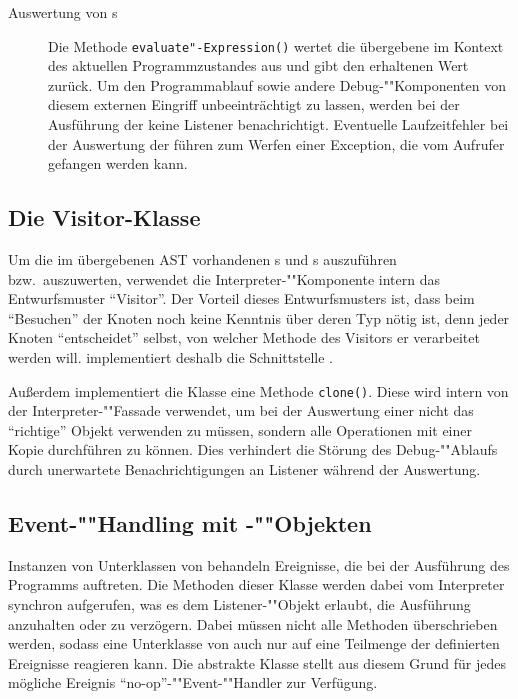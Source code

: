 \begin{description}
    \item[Auswertung von s]
    Die Methode \texttt{evaluate"-Expression()} wertet die übergebene  im Kontext des aktuellen Programmzustandes aus und gibt den erhaltenen Wert zurück. Um den Programmablauf sowie andere Debug-""Komponenten von diesem externen Eingriff unbeeinträchtigt zu lassen, werden bei der Ausführung der  keine Listener benachrichtigt. Eventuelle Laufzeitfehler bei der Auswertung der  führen zum Werfen einer Exception, die vom Aufrufer gefangen werden kann.
\end{description}

\subsection{Die Visitor-Klasse }
Um die im übergebenen AST vorhandenen s und s auszuführen bzw.\ auszuwerten, verwendet die Interpreter-""Komponente intern das Entwurfsmuster "`Visitor"'. Der Vorteil dieses Entwurfsmusters ist, dass beim "`Besuchen"' der Knoten noch keine Kenntnis über deren Typ nötig ist, denn jeder Knoten "`entscheidet"' selbst, von welcher Methode des Visitors er verarbeitet werden will.  implementiert deshalb die Schnittstelle .

Außerdem implementiert die Klasse  eine Methode \texttt{clone()}. Diese wird intern von der Interpreter-""Fassade verwendet, um bei der Auswertung einer  nicht das "`richtige"' Objekt verwenden zu müssen, sondern alle Operationen mit einer Kopie durchführen zu können. Dies verhindert die Störung des Debug-""Ablaufs durch unerwartete Benachrichtigungen an Listener während der Auswertung.

\subsection{Event-""Handling mit -""Objekten}
Instanzen von Unterklassen von  behandeln Ereignisse, die bei der Ausführung des Programms auftreten. Die Methoden dieser Klasse werden dabei vom Interpreter synchron aufgerufen, was es dem Listener-""Objekt erlaubt, die Ausführung anzuhalten oder zu verzögern. Dabei müssen nicht alle Methoden überschrieben werden, sodass eine Unterklasse von  auch nur auf eine Teilmenge der definierten Ereignisse reagieren kann. Die abstrakte Klasse  stellt aus diesem Grund für jedes mögliche Ereignis "`no-op"'-""Event-""Handler zur Verfügung.

